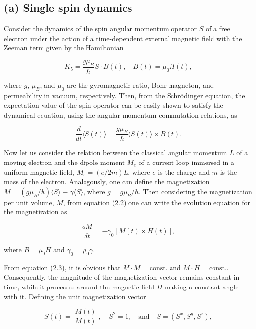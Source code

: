 \documentclass{article}
\begin{document}
	\subsection*{(a) Single spin dynamics}
	Consider the dynamics of the spin angular momentum operator $S$ of a free electron under the action of a time-dependent external magnetic field with the Zeeman term given by the Hamiltonian
	
	\begin{equation}
	K_5 = \frac{g\mu_B}{\hbar} S \cdot B(t), \quad B(t) = \mu_0 H(t),
	\end{equation}
	
	where $g$, $\mu_B$, and $\mu_0$ are the gyromagnetic ratio, Bohr magneton, and permeability in vacuum, respectively. Then, from the Schrödinger equation, the expectation value of the spin operator can be easily shown to satisfy the dynamical equation, using the angular momentum commutation relations, as
	
	\begin{equation}
	\frac{d}{dt} \langle S(t) \rangle = \frac{g\mu_B}{\hbar} \langle S(t) \rangle \times B(t).
	\end{equation}
	
	Now let us consider the relation between the classical angular momentum $L$ of a moving electron and the dipole moment $M_e$ of a current loop immersed in a uniform magnetic field, $M_e = (e/2m) L$, where $e$ is the charge and $m$ is the mass of the electron. Analogously, one can define the magnetization $M = (g\mu_B/\hbar)\langle S \rangle \equiv \gamma \langle S \rangle$, where $g = g\mu_B/\hbar$. Then considering the magnetization per unit volume, $M$, from equation (2.2) one can write the evolution equation for the magnetization as
	
	\begin{equation}
	\frac{dM}{dt} = -\gamma_0 [M(t) \times H(t)],
	\end{equation}
	
	where $B = \mu_0 H$ and $\gamma_0 = \mu_0 \gamma$.
	
	From equation (2.3), it is obvious that $M \cdot M = \text{const.}$ and $M \cdot H = \text{const.}$. Consequently, the magnitude of the magnetization vector remains constant in time, while it processes around the magnetic field $H$ making a constant angle with it. Defining the unit magnetization vector
	
	\begin{equation}
	S(t) = \frac{M(t)}{|M(t)|}, \quad S^2 = 1, \quad \text{and} \quad S = (S^x, S^y, S^z),
	\end{equation}
	
\end{document}
